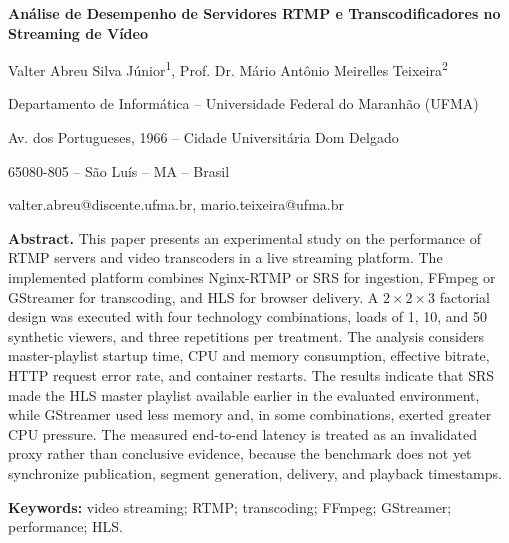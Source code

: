 \documentclass[10pt,a4paper]{article}
\newcommand{\articletitle}{Análise de Desempenho de Servidores RTMP e Transcodificadores no Streaming de Vídeo}
\begin{document}
\begin{center}
  \vspace*{-0.8cm}
  \parbox{0.92\textwidth}{
    \centering
    {\Large\bfseries \articletitle\par}
    \vspace{0.45cm}
    {\normalsize Valter Abreu Silva Júnior\textsuperscript{1}, Prof. Dr. Mário Antônio Meirelles Teixeira\textsuperscript{2}\par}
    \vspace{0.08cm}
    {\small Departamento de Informática -- Universidade Federal do Maranhão (UFMA)\par}
    {\small Av. dos Portugueses, 1966 -- Cidade Universitária Dom Delgado\par}
    {\small 65080-805 -- São Luís -- MA -- Brasil\par}
    {\small valter.abreu@discente.ufma.br, mario.teixeira@ufma.br\par}
  }
  \vspace{0.35cm}
\end{center}

\noindent\textbf{Abstract.} This paper presents an experimental study on the performance of RTMP servers and video transcoders in a live streaming platform. The implemented platform combines Nginx-RTMP or SRS for ingestion, FFmpeg or GStreamer for transcoding, and HLS for browser delivery. A $2\times2\times3$ factorial design was executed with four technology combinations, loads of 1, 10, and 50 synthetic viewers, and three repetitions per treatment. The analysis considers master-playlist startup time, CPU and memory consumption, effective bitrate, HTTP request error rate, and container restarts. The results indicate that SRS made the HLS master playlist available earlier in the evaluated environment, while GStreamer used less memory and, in some combinations, exerted greater CPU pressure. The measured end-to-end latency is treated as an invalidated proxy rather than conclusive evidence, because the benchmark does not yet synchronize publication, segment generation, delivery, and playback timestamps.

\noindent\textbf{Keywords:} video streaming; RTMP; transcoding; FFmpeg; GStreamer; performance; HLS.
\end{document}

